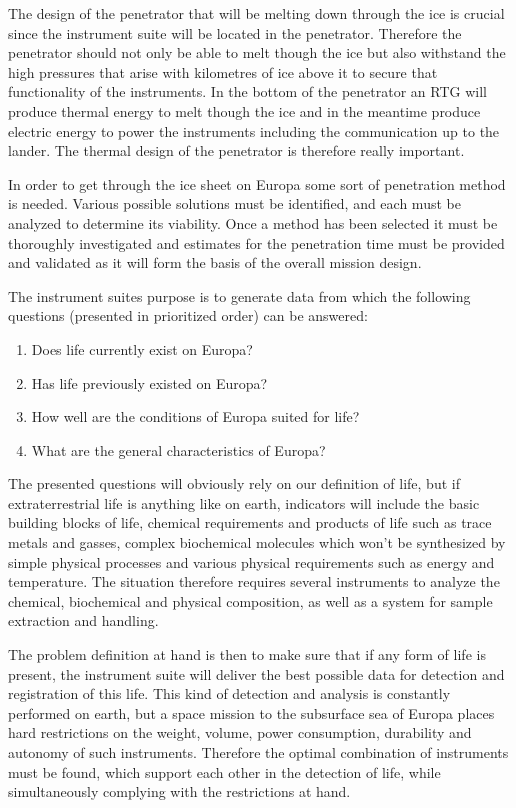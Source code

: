 The design of the penetrator that will be melting down through the ice is crucial since the instrument suite will be located in the penetrator. Therefore the penetrator should not only be able to melt though the ice but also withstand the high pressures that arise with kilometres of ice above it to secure that functionality of the instruments. In the bottom of the penetrator an RTG will produce thermal energy to melt though the ice and in the meantime produce electric energy to power the instruments including the communication up to the lander. The thermal design of the penetrator is therefore really important.

In order to get through the ice sheet on Europa some sort of penetration method is needed. Various possible solutions must be identified, and each must be analyzed to determine its viability. Once a method has been selected it must be thoroughly investigated and estimates for the penetration time must be provided and validated as it will form the basis of the overall mission design.

The instrument suites purpose is to generate data from which the following questions (presented in prioritized order) can be answered:
\begin{enumerate}
    \item Does life currently exist on Europa?
    \item Has life previously existed on Europa?
    \item How well are the conditions of Europa suited for life?
    \item What are the general characteristics of Europa?
\end{enumerate}

The presented questions will obviously rely on our definition of life, but if extraterrestrial life is anything like on earth, indicators will include the basic building blocks of life, chemical requirements and products of life such as trace metals and gasses, complex biochemical molecules which won’t be synthesized by simple physical processes and various physical requirements such as energy and temperature. The situation therefore requires several instruments to analyze the chemical, biochemical and physical composition, as well as a system for sample extraction and handling.

The problem definition at hand is then to make sure that if any form of life is present, the instrument suite will deliver the best possible data for detection and registration of this life. This kind of detection and analysis is constantly performed on earth, but a space mission to the subsurface sea of Europa places hard restrictions on the weight, volume, power consumption, durability and autonomy of such instruments. Therefore the optimal combination of instruments must be found, which support each other in the detection of life, while simultaneously complying with the restrictions at hand. 

